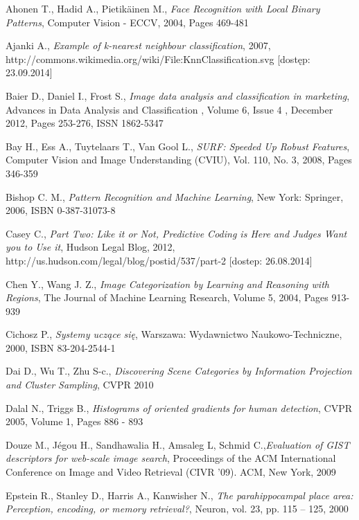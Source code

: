 \begin{thebibliography}{100} %

 Ahonen T., Hadid A., Pietikäinen M., \emph{Face Recognition with Local Binary Patterns}, Computer Vision - ECCV, 2004, Pages 469-481

 Ajanki A., \emph{Example of k-nearest neighbour classification}, 2007, http://commons.wikimedia.org/wiki/File:KnnClassification.svg [dostęp: 23.09.2014]

 Baier D., Daniel I., Frost S., \emph{Image data analysis and classification in marketing}, Advances in Data Analysis and Classification , Volume 6, Issue 4 , December 2012, Pages 253-276, ISSN 1862-5347

 Bay H., Ess A., Tuytelaars T., Van Gool L., \emph{SURF: Speeded Up Robust Features},  Computer Vision and Image Understanding (CVIU), Vol. 110, No. 3, 2008, Pages 346-359 

 Bishop C. M., \emph{Pattern Recognition and Machine Learning}, New York: Springer, 2006, ISBN 0-387-31073-8

 Casey C., \emph{Part Two: Like it or Not, Predictive Coding is Here and Judges Want you to Use it}, Hudson Legal Blog, 2012, http://us.hudson.com/legal/blog/postid/537/part-2 [dostep: 26.08.2014]

 Chen Y., Wang J. Z., \emph{Image Categorization by Learning and Reasoning with Regions}, The Journal of Machine Learning Research, Volume 5, 2004, Pages 913-939 

 Cichosz P., \emph{Systemy uczące się}, Warszawa: Wydawnictwo Naukowo-Techniczne, 2000, ISBN 83-204-2544-1

 Dai D., Wu T., Zhu S-c., \emph{Discovering Scene Categories by Information Projection and Cluster Sampling}, CVPR 2010

 Dalal N., Triggs B., \emph{Histograms of oriented gradients for human detection}, CVPR 2005, Volume 1, Pages 886 - 893 

 Douze M., Jégou H., Sandhawalia H., Amsaleg L, Schmid C.,\emph{Evaluation of GIST descriptors for web-scale image search}, Proceedings of the ACM International Conference on Image and Video Retrieval (CIVR '09). ACM, New York, 2009

 Epstein R., Stanley D., Harris A., Kanwisher N., \emph{The parahippocampal place area: Perception, encoding, or memory retrieval?}, Neuron, vol. 23, pp. 115 – 125, 2000


\end{thebibliography}
